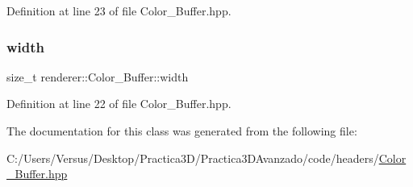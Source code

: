 Definition at line 23 of file Color\+\_\+\+Buffer.\+hpp.

\mbox{\label{classrenderer_1_1_color___buffer_ace3fab0552b94a1d7d7afcc592cd4503}} 
\subsubsection{\texorpdfstring{width}{width}}
{\footnotesize\ttfamily size\+\_\+t renderer\+::\+Color\+\_\+\+Buffer\+::width\hspace{0.3cm}{\ttfamily [protected]}}



Definition at line 22 of file Color\+\_\+\+Buffer.\+hpp.



The documentation for this class was generated from the following file\+:\begin{DoxyCompactItemize}
\item 
C\+:/\+Users/\+Versus/\+Desktop/\+Practica3\+D/\+Practica3\+D\+Avanzado/code/headers/\mbox{\hyperlink{_color___buffer_8hpp}{Color\+\_\+\+Buffer.\+hpp}}\end{DoxyCompactItemize}
